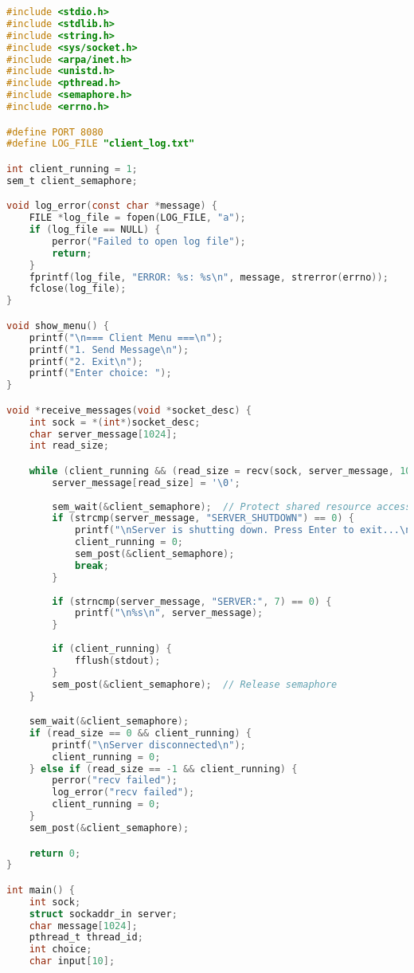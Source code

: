 \documentclass{article}
\begin{document}
\begin{lstlisting}[language=C, caption= client code - Socket Programming Code]
#include <stdio.h>
#include <stdlib.h>
#include <string.h>
#include <sys/socket.h>
#include <arpa/inet.h>
#include <unistd.h>
#include <pthread.h>
#include <semaphore.h>
#include <errno.h>

#define PORT 8080
#define LOG_FILE "client_log.txt"

int client_running = 1;
sem_t client_semaphore; 

void log_error(const char *message) {
    FILE *log_file = fopen(LOG_FILE, "a");
    if (log_file == NULL) {
        perror("Failed to open log file");
        return;
    }
    fprintf(log_file, "ERROR: %s: %s\n", message, strerror(errno));
    fclose(log_file);
}

void show_menu() {
    printf("\n=== Client Menu ===\n");
    printf("1. Send Message\n");
    printf("2. Exit\n");
    printf("Enter choice: ");
}

void *receive_messages(void *socket_desc) {
    int sock = *(int*)socket_desc;
    char server_message[1024];
    int read_size;

    while (client_running && (read_size = recv(sock, server_message, 1024, 0)) > 0) {
        server_message[read_size] = '\0';
        
        sem_wait(&client_semaphore);  // Protect shared resource access
        if (strcmp(server_message, "SERVER_SHUTDOWN") == 0) {
            printf("\nServer is shutting down. Press Enter to exit...\n");
            client_running = 0;
            sem_post(&client_semaphore);
            break;
        }
        
        if (strncmp(server_message, "SERVER:", 7) == 0) {
            printf("\n%s\n", server_message);
        }
        
        if (client_running) {
            fflush(stdout);
        }
        sem_post(&client_semaphore);  // Release semaphore
    }

    sem_wait(&client_semaphore);
    if (read_size == 0 && client_running) {
        printf("\nServer disconnected\n");
        client_running = 0;
    } else if (read_size == -1 && client_running) {
        perror("recv failed");
        log_error("recv failed");
        client_running = 0;
    }
    sem_post(&client_semaphore);

    return 0;
}

int main() {
    int sock;
    struct sockaddr_in server;
    char message[1024];
    pthread_t thread_id;
    int choice;
    char input[10];


\end{lstlisting}
\end{document}
